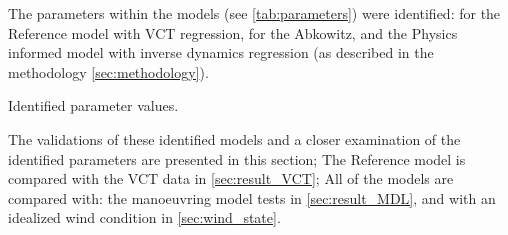 The parameters within the models (see \autoref{tab:parameters}) were identified: for the Reference model with VCT regression, for the Abkowitz, and the Physics informed model with inverse dynamics regression (as described in the methodology \autoref{sec:methodology}).
\begin{table}[h]
    \centering
    \caption{Identified parameter values.}
    \label{tab:parameters}
\end{table}
The validations of these identified models and a closer examination of the identified parameters are presented in this section; The Reference model is compared with the VCT data in \autoref{sec:result_VCT}; All of the models are compared with: the manoeuvring model tests in \autoref{sec:result_MDL}, and with an idealized wind condition in \autoref{sec:wind_state}.